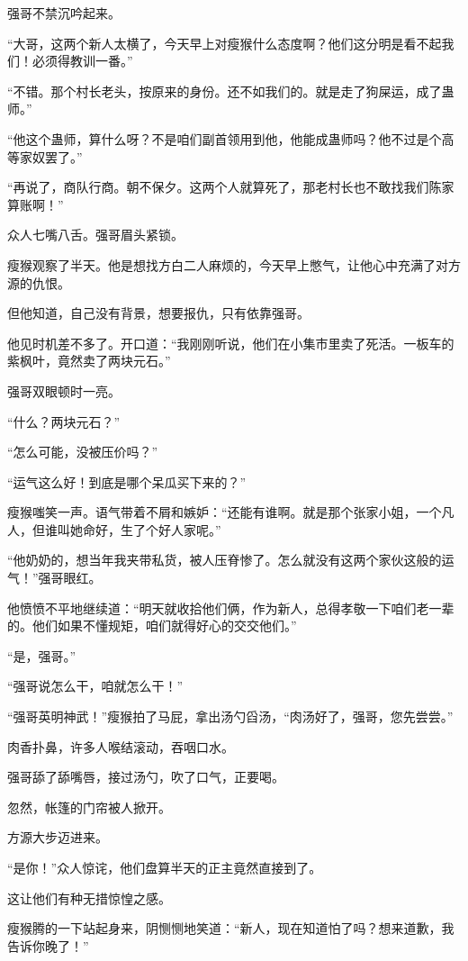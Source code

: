 \begin{this_body}
强哥不禁沉吟起来。

“大哥，这两个新人太横了，今天早上对瘦猴什么态度啊？他们这分明是看不起我们！必须得教训一番。”

“不错。那个村长老头，按原来的身份。还不如我们的。就是走了狗屎运，成了蛊师。”

“他这个蛊师，算什么呀？不是咱们副首领用到他，他能成蛊师吗？他不过是个高等家奴罢了。”

“再说了，商队行商。朝不保夕。这两个人就算死了，那老村长也不敢找我们陈家算账啊！”

众人七嘴八舌。强哥眉头紧锁。

瘦猴观察了半天。他是想找方白二人麻烦的，今天早上憋气，让他心中充满了对方源的仇恨。

但他知道，自己没有背景，想要报仇，只有依靠强哥。

他见时机差不多了。开口道：“我刚刚听说，他们在小集市里卖了死活。一板车的紫枫叶，竟然卖了两块元石。”

强哥双眼顿时一亮。

“什么？两块元石？”

“怎么可能，没被压价吗？”

“运气这么好！到底是哪个呆瓜买下来的？”

瘦猴嗤笑一声。语气带着不屑和嫉妒：“还能有谁啊。就是那个张家小姐，一个凡人，但谁叫她命好，生了个好人家呢。”

“他奶奶的，想当年我夹带私货，被人压脊惨了。怎么就没有这两个家伙这般的运气！”强哥眼红。

他愤愤不平地继续道：“明天就收拾他们俩，作为新人，总得孝敬一下咱们老一辈的。他们如果不懂规矩，咱们就得好心的交交他们。”

“是，强哥。”

“强哥说怎么干，咱就怎么干！”

“强哥英明神武！”瘦猴拍了马屁，拿出汤勺舀汤，“肉汤好了，强哥，您先尝尝。”

肉香扑鼻，许多人喉结滚动，吞咽口水。

强哥舔了舔嘴唇，接过汤勺，吹了口气，正要喝。

忽然，帐篷的门帘被人掀开。

方源大步迈进来。

“是你！”众人惊诧，他们盘算半天的正主竟然直接到了。

这让他们有种无措惊惶之感。

瘦猴腾的一下站起身来，阴恻恻地笑道：“新人，现在知道怕了吗？想来道歉，我告诉你晚了！”


\end{this_body}
